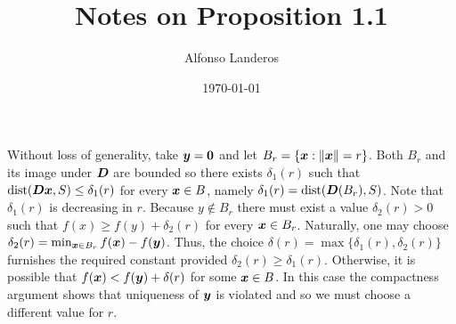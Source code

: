\documentclass{article}
\title{Notes on Proposition 1.1}
\author{Alfonso Landeros}
\date{\today}
\begin{document}
\maketitle

Without loss of generality, take \(\boldsymbol{y} = \boldsymbol{0}\) and
let \(B_{r} = \{\boldsymbol{x} : \|\boldsymbol{x}\| = r\}\).
Both \(B_{r}\) and its image under \(\boldsymbol{D}\) are bounded so there exists \(\delta_{1}(r)\) such that \(\mathop{\rm dist}\nolimits(\boldsymbol{D} \boldsymbol{x}, S) \le \delta_{1}(r)\) for every \(\boldsymbol{x} \in B\), namely \(\delta_{1}(r) = \mathop{\rm dist}\nolimits(\boldsymbol{D}(B_{r}), S)\).
Note that \(\delta_{1}(r)\) is decreasing in \(r\).
Because \(y \notin B_{r}\) there must exist a value \(\delta_{2}(r) > 0\) such that \(f(x) \ge f(y) + \delta_{2}(r)\) for every \(\boldsymbol{x} \in B_{r}\).
Naturally, one may choose \(\delta_{2}(r) = \min_{\boldsymbol{x} \in B_{r}} f(\boldsymbol{x}) - f(\boldsymbol{y})\).
Thus, the choice \(\delta(r) = \max\{\delta_{1}(r), \delta_{2}(r)\}\) furnishes the required constant provided \(\delta_{2}(r) \ge \delta_{1}(r)\).
Otherwise, it is possible that \(f(\boldsymbol{x}) < f(\boldsymbol{y}) + \delta(r)\) for some \(\boldsymbol{x} \in B\).
In this case the compactness argument shows that uniqueness of \(\boldsymbol{y}\) is violated and so we must choose a different value for \(r\).

\begin{figure}[!htbp]
    \centering
    \caption{}
    \label{}
\end{figure}
\end{document}

